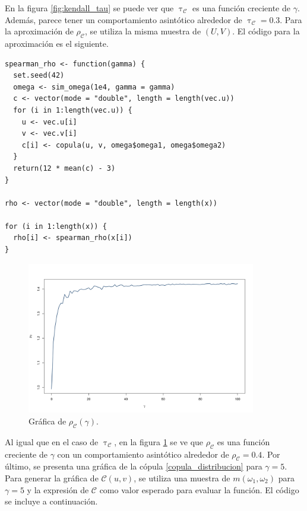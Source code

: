 \documentclass[11pt,a4paper]{article}
\newcommand{\C}{\mathcal{C}}
\begin{document}
En la figura \ref{fig:kendall_tau} se puede ver que $\uptau_\C$ es una función creciente de $\gamma$. Además, parece tener un comportamiento asintótico alrededor de $\uptau_\C = 0.3$. Para la aproximación de $\rho_\C$, se utiliza la misma muestra de $(U, V)$. El código para la aproximación es el siguiente.\\

\begin{lstlisting}
spearman_rho <- function(gamma) {
  set.seed(42)
  omega <- sim_omega(1e4, gamma = gamma)
  c <- vector(mode = "double", length = length(vec.u))
  for (i in 1:length(vec.u)) {
    u <- vec.u[i]
    v <- vec.v[i]
    c[i] <- copula(u, v, omega$omega1, omega$omega2)
  }
  return(12 * mean(c) - 3)
}

rho <- vector(mode = "double", length = length(x))

for (i in 1:length(x)) {
  rho[i] <- spearman_rho(x[i])
}
\end{lstlisting}\leavevmode\newline

\begin{figure}[h]
\centering\includegraphics[width=10cm]{spearman_rho.png}
\caption{Gráfica de $\rho_\C (\gamma)$.}
\label{fig:spearman_rho}
\end{figure}

Al igual que en el caso de $\uptau_\C$, en la figura \ref{fig:spearman_rho} se ve que $\rho_\C$ es una función creciente de $\gamma$ con un comportamiento asintótico alrededor de $\rho_\C = 0.4$. Por último, se presenta una gráfica de la cópula \eqref{copula_distribucion} para $\gamma = 5$. Para generar la gráfica de $\C(u, v)$, se utiliza una muestra de $m(\omega_1, \omega_2)$ para $\gamma = 5$ y la expresión de $\C$ como valor esperado para evaluar la función. El código se incluye a continuación.\\
\end{document}
